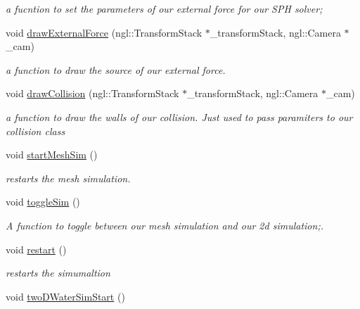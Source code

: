 \begin{DoxyCompactItemize}
\begin{DoxyCompactList}\small\item\em a fucntion to set the parameters of our external force for our S\-P\-H solver; \end{DoxyCompactList}\item 
void \hyperlink{classSPHMelt_a9286b6a873a0103ef13b2bc163bd75d2}{draw\-External\-Force} (ngl\-::\-Transform\-Stack $\ast$\-\_\-transform\-Stack, ngl\-::\-Camera $\ast$\-\_\-cam)
\begin{DoxyCompactList}\small\item\em a function to draw the source of our external force. \end{DoxyCompactList}\item 
void \hyperlink{classSPHMelt_ad291297d1b9c634b82ae5d033d9eb919}{draw\-Collision} (ngl\-::\-Transform\-Stack $\ast$\-\_\-transform\-Stack, ngl\-::\-Camera $\ast$\-\_\-cam)
\begin{DoxyCompactList}\small\item\em a function to draw the walls of our collision. Just used to pass paramiters to our collision class \end{DoxyCompactList}\item 
\hypertarget{classSPHMelt_a7922b30c46531e98ea6bbfa6ac51aa2a}{void \hyperlink{classSPHMelt_a7922b30c46531e98ea6bbfa6ac51aa2a}{start\-Mesh\-Sim} ()}\label{classSPHMelt_a7922b30c46531e98ea6bbfa6ac51aa2a}

\begin{DoxyCompactList}\small\item\em restarts the mesh simulation. \end{DoxyCompactList}\item 
\hypertarget{classSPHMelt_ab4ea1cf0ac6cec3828b296229505d4a6}{void \hyperlink{classSPHMelt_ab4ea1cf0ac6cec3828b296229505d4a6}{toggle\-Sim} ()}\label{classSPHMelt_ab4ea1cf0ac6cec3828b296229505d4a6}

\begin{DoxyCompactList}\small\item\em A function to toggle between our mesh simulation and our 2d simulation;. \end{DoxyCompactList}\item 
\hypertarget{classSPHMelt_a7645dc2f671f164fc288b2e0a6c0be37}{void \hyperlink{classSPHMelt_a7645dc2f671f164fc288b2e0a6c0be37}{restart} ()}\label{classSPHMelt_a7645dc2f671f164fc288b2e0a6c0be37}

\begin{DoxyCompactList}\small\item\em restarts the simumaltion \end{DoxyCompactList}\item 
\hypertarget{classSPHMelt_a3765b15c184fc6bda80fecdb43cfb287}{void \hyperlink{classSPHMelt_a3765b15c184fc6bda80fecdb43cfb287}{two\-D\-Water\-Sim\-Start} ()}\label{classSPHMelt_a3765b15c184fc6bda80fecdb43cfb287}


\end{DoxyCompactItemize}

